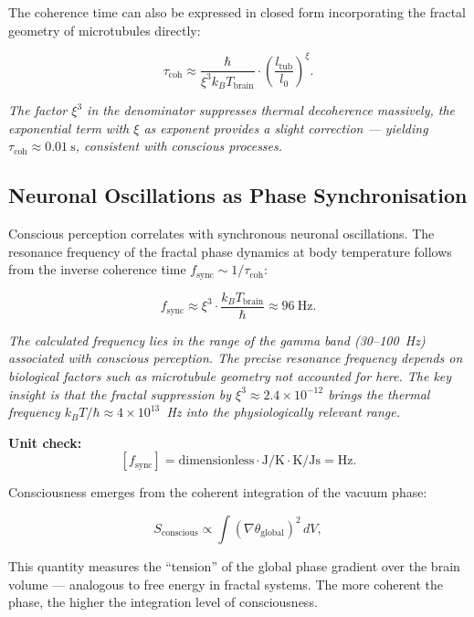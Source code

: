 	The coherence time can also be expressed in closed form incorporating the fractal geometry of microtubules directly:
	
	\begin{equation}
		\tau_{\text{coh}} \approx \frac{\hbar}{\xi^3 k_B T_{\text{brain}}} \cdot \left( \frac{l_{\text{tub}}}{l_0} \right)^{\xi}.
	\end{equation}
	
	\textit{The factor \(\xi^3\) in the denominator suppresses thermal decoherence massively, the exponential term with \(\xi\) as exponent provides a slight correction — yielding \(\tau_{\text{coh}} \approx \SI{0.01}{\second}\), consistent with conscious processes.}
	
	\subsection*{Neuronal Oscillations as Phase Synchronisation}
	
	Conscious perception correlates with synchronous neuronal oscillations. The resonance frequency of the fractal phase dynamics at body temperature follows from the inverse coherence time \(f_{\text{sync}} \sim 1/\tau_{\text{coh}}\):
	
	\begin{equation}
		f_{\text{sync}} \approx \xi^{3} \cdot \frac{k_B T_{\text{brain}}}{\hbar} \approx \SI{96}{\hertz}.
	\end{equation}
	
	\textit{The calculated frequency lies in the range of the gamma band (30--100~Hz) associated with conscious perception. The precise resonance frequency depends on biological factors such as microtubule geometry not accounted for here. The key insight is that the fractal suppression by \(\xi^3 \approx 2.4 \times 10^{-12}\) brings the thermal frequency \(k_B T/\hbar \approx 4 \times 10^{13}\)~Hz into the physiologically relevant range.}
	
	\textbf{Unit check:}
	\[
	[f_{\text{sync}}] = \text{dimensionless} \cdot \si{\joule\per\kelvin} \cdot \si{\kelvin} / \si{\joule\second} = \si{\hertz}.
	\]
	
	Consciousness emerges from the coherent integration of the vacuum phase:
	
	\begin{equation}
		S_{\text{conscious}} \propto \int (\nabla \theta_{\text{global}})^2 \, dV,
	\end{equation}
	
	This quantity measures the “tension” of the global phase gradient over the brain volume — analogous to free energy in fractal systems. The more coherent the phase, the higher the integration level of consciousness.
	

